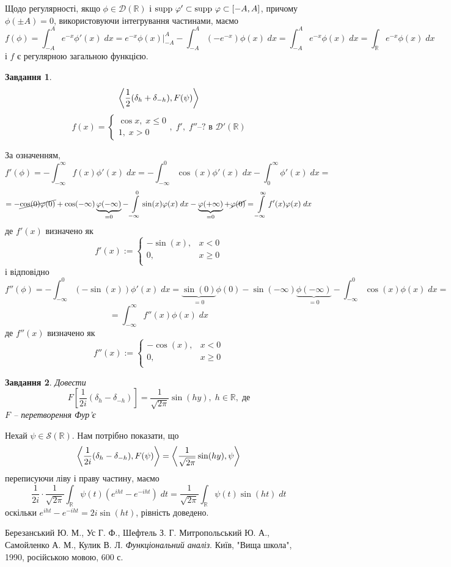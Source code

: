 \documentclass[12pt]{article} %
\newtheorem{prob}{Завдання}
\newcommand{\dt}{\;dt}
\newcommand{\dx}{\;dx}
\begin{document}
Щодо регулярності, якщо $\phi\in\mathcal{D}(\mathbb{R})$ і $\mbox{supp }\varphi'\subset\mbox{supp }\varphi\subset[-A,A]$, причому $\phi(\pm A)=0$, використовуючи
інтегрування частинами, маємо
\[f(\phi)=\int_{-A}^Ae^{-x}\phi'(x)\dx=e^{-x}\phi(x)\bigg|_{-A}^A-\int_{-A}^A(-e^{-x})\phi(x)\dx=\int_{-A}^Ae^{-x}\phi(x)\dx=\int_\mathbb{R}
e^{-x}\phi(x)\dx\]
і $f$ є регулярною загальною функцією.
\begin{prob}\[\left<\frac{1}{2}(\delta_h+\delta_{-h}),F(\psi)\right>\]
	\[f(x)=\left\{\begin{array}{ll}\cos x,\;x\leq0\\1,\;x>0\end{array}\right.,\;\mbox{$f',\;f''$--?{ в }$\mathcal{D}'(\mathbb{R})$}\]
\end{prob}
За означенням,
\[f'(\phi)=-\int_{-\infty}^\infty f(x)\phi'(x)\dx=-\int_{-\infty}^0\cos(x)\phi'(x)\dx-\int_0^{\infty}\phi'(x)\dx=\]
\[=-\cancel{\cos(0)\phi(0)}+\cos(-\infty)\underbrace{\phi(-\infty)}
_{=0}-\int_{-\infty}^0\sin(x)\phi(x)\dx-\underbrace{\phi(+\infty)}_{=0}+\cancel{\phi(0)}=\int_{-\infty}^\infty f'(x)\phi(x)\dx\]
де $f'(x)$ визначено як
\[f'(x):=\left\{\begin{array}{ll}-\sin(x),&x<0\\0,&x\geq0\\\end{array}\right.\]
і відповідно 
\[f''(\phi)=-\int_{-\infty}^{0}(-\sin(x))\phi'(x)\dx=\underbrace{\sin(0)}_{=0}\phi(0)
-\sin(-\infty)\underbrace{\phi(-\infty)}_{=0}-\int_{-\infty}^{0}\cos(x)\phi(x)\dx=\]\[=\int_{-\infty}^\infty f''(x)\phi(x)\dx\]
де $f''(x)$ визначено як
\[f''(x):=\left\{\begin{array}{ll}-\cos(x),&x<0\\0,&x\geq0\\\end{array}\right.\]
\begin{prob}
	Довести
	\[F[\frac{1}{2i}(\delta_h-\delta_{-h})]=\frac{1}{\sqrt{2\pi}}\sin(hy),\;h\in\mathbb{R},\;\mbox{де}\]
	$F$ -- перетворення Фур’є
\end{prob}
Нехай $\psi\in\mathcal{S}(\mathbb{R})$. Нам потрібно показати, що
\[\left<\frac{1}{2i}(\delta_h-\delta_{-h}),F(\psi)\right>=\left<\frac{1}{\sqrt{2\pi}}\sin(hy),\psi\right>\]
переписуючи ліву і праву частину, маємо
\[\frac{1}{2i}\cdot\frac{1}{\sqrt{2\pi}}{\int_{\mathbb{R}}\psi(t)(e^{iht}-e^{-iht})\dt}=\frac{1}{\sqrt{2\pi}}\int_{\mathbb{R}}\psi(t)
\sin(ht)\dt\]
оскільки $e^{iht}-e^{-iht}=2i\sin(ht)$, рівність доведено.
\begin{thebibliography}{9}
Березанський Ю. М., Ус Г. Ф., Шефтель З. Г.
Митропольський Ю. А., Самойленко А. М., Кулик В. Л.
\emph{Функціональний аналіз}.
Київ, "Вища школа"{}, 1990, російською мовою, 600 с.
\end{thebibliography}
\end{document}
